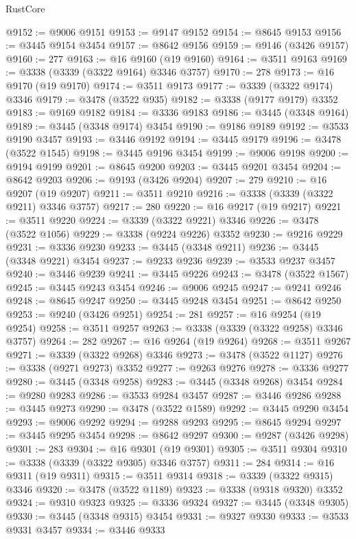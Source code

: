 \begin{lexlean}{RustCore}
\begin{coremodule}
@9152 := @9006 @9151
@9153 := @9147 @9152
@9154 := @8645 @9153
@9156 := @3445 @9154 @3454
@9157 := @8642 @9156
@9159 := @9146 (@3426 @9157)
@9160 := 277
@9163 := @16 @9160 (@19 @9160)
@9164 := @3511 @9163
@9169 := @3338 (@3339 (@3322 @9164) @3346 @3757)
@9170 := 278
@9173 := @16 @9170 (@19 @9170)
@9174 := @3511 @9173
@9177 := @3339 (@3322 @9174) @3346
@9179 := @3478 (@3522 @935)
@9182 := @3338 (@9177 @9179) @3352
@9183 := @9169 @9182
@9184 := @3336 @9183
@9186 := @3445 (@3348 @9164)
@9189 := @3445 (@3348 @9174) @3454
@9190 := @9186 @9189
@9192 := @3533 @9190 @3457
@9193 := @3446 @9192
@9194 := @3445 @9179
@9196 := @3478 (@3522 @1545)
@9198 := @3445 @9196 @3454
@9199 := @9006 @9198
@9200 := @9194 @9199
@9201 := @8645 @9200
@9203 := @3445 @9201 @3454
@9204 := @8642 @9203
@9206 := @9193 (@3426 @9204)
@9207 := 279
@9210 := @16 @9207 (@19 @9207)
@9211 := @3511 @9210
@9216 := @3338 (@3339 (@3322 @9211) @3346 @3757)
@9217 := 280
@9220 := @16 @9217 (@19 @9217)
@9221 := @3511 @9220
@9224 := @3339 (@3322 @9221) @3346
@9226 := @3478 (@3522 @1056)
@9229 := @3338 (@9224 @9226) @3352
@9230 := @9216 @9229
@9231 := @3336 @9230
@9233 := @3445 (@3348 @9211)
@9236 := @3445 (@3348 @9221) @3454
@9237 := @9233 @9236
@9239 := @3533 @9237 @3457
@9240 := @3446 @9239
@9241 := @3445 @9226
@9243 := @3478 (@3522 @1567)
@9245 := @3445 @9243 @3454
@9246 := @9006 @9245
@9247 := @9241 @9246
@9248 := @8645 @9247
@9250 := @3445 @9248 @3454
@9251 := @8642 @9250
@9253 := @9240 (@3426 @9251)
@9254 := 281
@9257 := @16 @9254 (@19 @9254)
@9258 := @3511 @9257
@9263 := @3338 (@3339 (@3322 @9258) @3346 @3757)
@9264 := 282
@9267 := @16 @9264 (@19 @9264)
@9268 := @3511 @9267
@9271 := @3339 (@3322 @9268) @3346
@9273 := @3478 (@3522 @1127)
@9276 := @3338 (@9271 @9273) @3352
@9277 := @9263 @9276
@9278 := @3336 @9277
@9280 := @3445 (@3348 @9258)
@9283 := @3445 (@3348 @9268) @3454
@9284 := @9280 @9283
@9286 := @3533 @9284 @3457
@9287 := @3446 @9286
@9288 := @3445 @9273
@9290 := @3478 (@3522 @1589)
@9292 := @3445 @9290 @3454
@9293 := @9006 @9292
@9294 := @9288 @9293
@9295 := @8645 @9294
@9297 := @3445 @9295 @3454
@9298 := @8642 @9297
@9300 := @9287 (@3426 @9298)
@9301 := 283
@9304 := @16 @9301 (@19 @9301)
@9305 := @3511 @9304
@9310 := @3338 (@3339 (@3322 @9305) @3346 @3757)
@9311 := 284
@9314 := @16 @9311 (@19 @9311)
@9315 := @3511 @9314
@9318 := @3339 (@3322 @9315) @3346
@9320 := @3478 (@3522 @1189)
@9323 := @3338 (@9318 @9320) @3352
@9324 := @9310 @9323
@9325 := @3336 @9324
@9327 := @3445 (@3348 @9305)
@9330 := @3445 (@3348 @9315) @3454
@9331 := @9327 @9330
@9333 := @3533 @9331 @3457
@9334 := @3446 @9333

\end{coremodule}
\end{lexlean}
